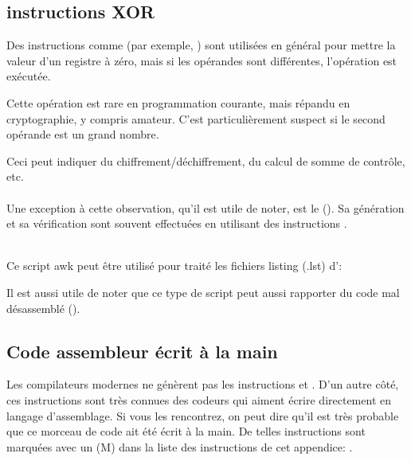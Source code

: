 
\subsection{instructions XOR}

Des instructions comme  (par exemple, ) sont utilisées
en général pour mettre la valeur d'un registre à zéro, mais si les opérandes sont
différentes, l'opération  est exécutée.

Cette opération est rare en programmation courante, mais répandu en cryptographie,
y compris amateur.
C'est particulièrement suspect si le second opérande est un grand nombre.

Ceci peut indiquer du chiffrement/déchiffrement, du calcul de somme de contrôle, etc.\\
\\

Une exception à cette observation, qu'il est utile de noter, est le  ().
Sa génération et sa vérification sont souvent effectuées en utilisant des instructions
\XOR. \\
\\

Ce script awk peut être utilisé pour traité les fichiers listing (.lst) d'\IDA:



Il est aussi utile de noter que ce type de script peut aussi rapporter du code mal
désassemblé
().

\subsection{Code assembleur écrit à la main}


Les compilateurs modernes ne génèrent pas les instructions  et .
D'un autre côté, ces instructions sont très connues des codeurs qui aiment écrire
directement en langage d'assemblage.
Si vous les rencontrez, on peut dire qu'il est très probable que ce morceau de code
ait été écrit à la main.
De telles instructions sont marquées avec un (M) dans la liste des instructions de
cet appendice: .


